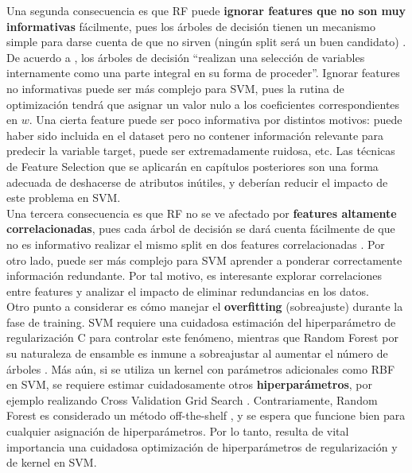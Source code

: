 Una segunda consecuencia es que RF puede \textbf{ignorar features que no son muy informativas} fácilmente, pues los árboles de decisión tienen un mecanismo simple para darse cuenta de que no sirven (ningún split será un buen candidato) \cite{statisticallearning}. De acuerdo a \cite{statisticallearning}, los árboles de decisión ``realizan una selección de variables internamente como una parte integral en su forma de proceder''. Ignorar features no informativas puede ser más complejo para SVM, pues la rutina de optimización tendrá que asignar un valor nulo a los coeficientes correspondientes en $w$. Una cierta feature puede ser poco informativa por distintos motivos: puede haber sido incluida en el dataset pero no contener información relevante para predecir la variable target, puede ser extremadamente ruidosa, etc.  Las técnicas de Feature Selection que se aplicarán en capítulos posteriores son una forma adecuada de deshacerse de atributos inútiles, y deberían reducir el impacto de este problema en SVM. \\

Una tercera consecuencia es que RF no se ve afectado por \textbf{features altamente correlacionadas}, pues cada árbol de decisión se dará cuenta fácilmente de que no es informativo realizar el mismo split en dos features correlacionadas \cite{rf_collinearity}. Por otro lado, puede ser más complejo para SVM aprender a ponderar correctamente información redundante. Por tal motivo, es interesante explorar correlaciones entre features y analizar el impacto de eliminar redundancias en los datos. \\

Otro punto a considerar es cómo manejar el \textbf{overfitting} (sobreajuste) durante la fase de training. SVM requiere una cuidadosa estimación del hiperparámetro de regularización C para controlar este fenómeno, mientras que Random Forest por su naturaleza de ensamble es inmune a sobreajustar al aumentar el número de árboles \cite{rf}. Más aún, si se utiliza un kernel con parámetros adicionales como RBF en SVM, se requiere estimar cuidadosamente otros \textbf{hiperparámetros}, por ejemplo realizando Cross Validation Grid Search \cite{svm_practical}. Contrariamente, Random Forest es considerado un método off-the-shelf \cite{offshelf}, y se espera que funcione bien para cualquier asignación de hiperparámetros. Por lo tanto, resulta de vital importancia una cuidadosa optimización de hiperparámetros de regularización y de kernel en SVM. \\

